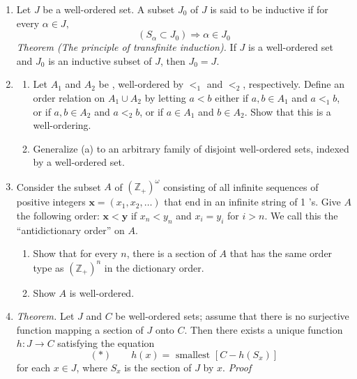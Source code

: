 \begin{enumerate}[itemsep=0.4em, parsep=0pt, topsep=0pt, partopsep=0pt, leftmargin=*, label=\arabic*., ref=\arabic*]
\begin{enumerate}[itemsep=0.2em, parsep=0pt, topsep=0pt, partopsep=0pt, leftmargin=*, label=(\alph*), align=left]
  \end{enumerate}
\item Let \(J\) be a well-ordered set. A subset \(J_{0}\) of \(J\) is said to be inductive if for every \(\alpha \in J,\) \[ ({S_{\alpha } \subset {J}_{0}}) \Rightarrow \alpha \in {J}_{0} \] \textsl{Theorem (The principle of transfinite induction).} If \(J\) is a well-ordered set and \(J_{0}\) is an inductive subset of \(J\), then \(J_{0} = J\).
\item
  \begin{enumerate}[itemsep=0.2em, parsep=0pt, topsep=0pt, partopsep=0pt, leftmargin=*, label=(\alph*), align=left]
  \item Let \(A_{1}\) and \(A_{2}\) be , well-ordered by \({ < }_{1}\) and \({ < }_{2}\), respectively. Define an order relation on \(A_{1} \cup {A}_{2}\) by letting \(a < b\) either if \(a,b \in {A}_{1}\) and \(a{ < }_{1}b\), or if \(a,b \in {A}_{2}\) and \(a{ < }_{2}b\), or if \(a \in {A}_{1}\) and \(b \in {A}_{2}\). Show that this is a well-ordering.
  \item Generalize (a) to an arbitrary family of disjoint well-ordered sets, indexed by a well-ordered set.
  \end{enumerate}
\item Consider the subset \(A\) of \({(\mathbb{Z}_{+}) }^{\omega }\) consisting of all infinite sequences of positive integers \(\mathbf{x} = ({x_{1},x_{2},\ldots })\) that end in an infinite string of 1 's. Give \(A\) the following order: \(\mathbf{x} < \mathbf{y}\) if \(x_{n} < y_{n}\) and \(x_{i} = y_{i}\) for \(i > n\). We call this the ``antidictionary order'' on \(A\).
  \begin{enumerate}[itemsep=0.2em, parsep=0pt, topsep=0pt, partopsep=0pt, leftmargin=*, label=(\alph*), align=left]
  \item Show that for every \(n\), there is a section of \(A\) that has the same order type as \({(\mathbb{Z}_{+}) }^{n}\) in the dictionary order.
  \item Show \(A\) is well-ordered.
  \end{enumerate}
\item \textsl{Theorem.} Let \(J\) and \(C\) be well-ordered sets; assume that there is no surjective function mapping a section of \(J\) onto \(C\). Then there exists a unique function \(h : J \rightarrow C\) satisfying the equation \[ (*) \qquad h(x) = \text{ smallest }[{C - h(S_{x}) }] \] for each \(x \in J\), where \(S_{x}\) is the section of \(J\) by \(x\).
\textsl{Proof}
  \begin{enumerate}[itemsep=0.2em, parsep=0pt, topsep=0pt, partopsep=0pt, leftmargin=*, label=(\alph*), align=left]

\end{enumerate}
\end{enumerate}
